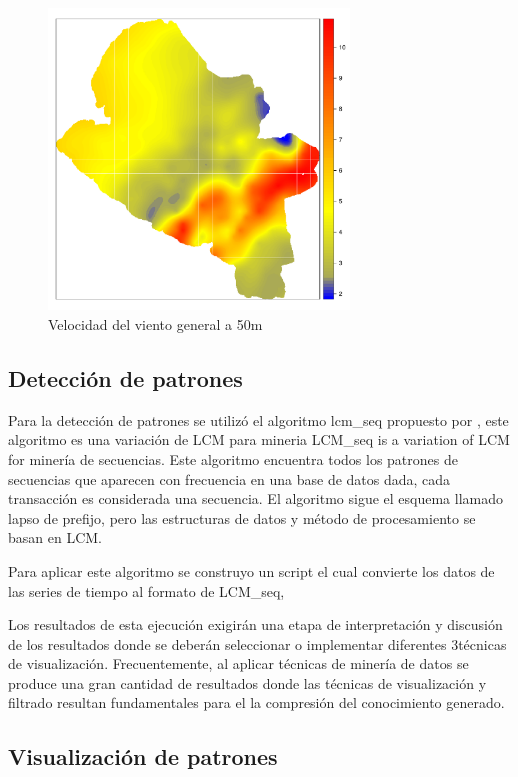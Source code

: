 \begin{figure}
  \centering
  \includegraphics[width = 8cm]{mapGeneralWind.pdf}
  \caption{Velocidad del viento general a 50m}
  \label{fig:total}
\end{figure}



\subsection{Detección de patrones}

Para la detección de patrones se utilizó el algoritmo lcm\_seq propuesto por \cite{uno_lcm_seq},
este algoritmo es una variación de LCM para mineria
LCM\_seq is a variation of LCM for minería de secuencias. 
Este algoritmo encuentra todos los patrones de secuencias que aparecen con frecuencia
en una base de datos dada, cada transacción es considerada una secuencia. El algoritmo sigue el esquema 
llamado lapso de prefijo, pero las estructuras de datos y método de procesamiento se basan en LCM.


Para aplicar este algoritmo se construyo un script el cual convierte los datos de las series de tiempo al
formato de LCM\_seq,  


Los resultados de esta ejecución exigirán una etapa de interpretación y discusión
 de los resultados donde se deberán seleccionar o implementar diferentes
3técnicas de visualización. Frecuentemente, al aplicar técnicas de minería de datos
se produce una gran cantidad de resultados donde las técnicas de visualización y
filtrado resultan fundamentales para el la compresión del conocimiento generado.

\subsection{Visualización de patrones}

